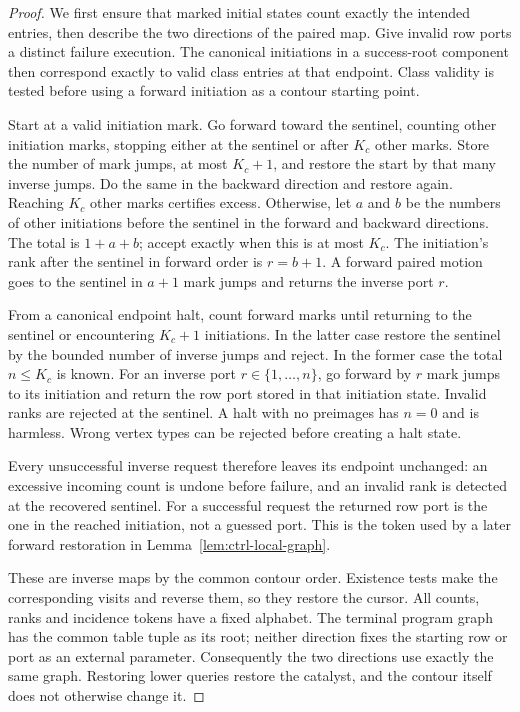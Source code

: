 \begin{proof}
We first ensure that marked initial states count exactly the intended entries, then describe the two directions of the paired map. Give invalid row ports a distinct failure execution.  The canonical
initiations in a success-root component then correspond exactly to
valid class entries at that endpoint.  Class validity is tested before
using a forward initiation as a contour starting point.

Start at a valid initiation mark.  Go forward toward the sentinel,
counting other initiation marks, stopping either at the sentinel or
after $K_c$ other marks.  Store the number of mark jumps, at most
$K_c+1$, and restore the start by that many inverse jumps.  Do the same
in the backward direction and restore again.  Reaching $K_c$ other
marks certifies excess.  Otherwise, let $a$ and $b$ be the numbers of
other initiations before the sentinel in the forward and backward
directions.  The total is $1+a+b$; accept exactly when this is at most
$K_c$.  The initiation's rank after the sentinel in forward order is
$r=b+1$.  A forward paired motion goes to the sentinel in $a+1$ mark
jumps and returns the inverse port $r$.

From a canonical endpoint halt, count forward marks until returning to
the sentinel or encountering $K_c+1$ initiations.  In the latter case
restore the sentinel by the bounded number of inverse jumps and
reject.  In the former case the total $n\le K_c$ is known.  For an
inverse port $r\in\{1,\ldots,n\}$, go forward by $r$ mark jumps to its
initiation and return the row port stored in that initiation state.
Invalid ranks are rejected at the sentinel.  A halt with no preimages
has $n=0$ and is harmless.  Wrong vertex types can be rejected before
creating a halt state.

Every unsuccessful inverse request therefore leaves its endpoint
unchanged: an excessive incoming count is undone before failure, and an
invalid rank is detected at the recovered sentinel.  For a successful
request the returned row port is the one in the reached initiation,
not a guessed port.  This is the token used by a later forward
restoration in Lemma~\ref{lem:ctrl-local-graph}.

These are inverse maps by the common contour order.  Existence tests
make the corresponding visits and reverse them, so they restore the
cursor.  All counts, ranks and incidence tokens have a fixed alphabet.
The terminal program graph has the common table tuple as its root;
neither direction fixes the starting row or port as an external
parameter.  Consequently the two directions use exactly the same
graph.  Restoring lower queries restore the catalyst, and the contour
itself does not otherwise change it.
\end{proof}

